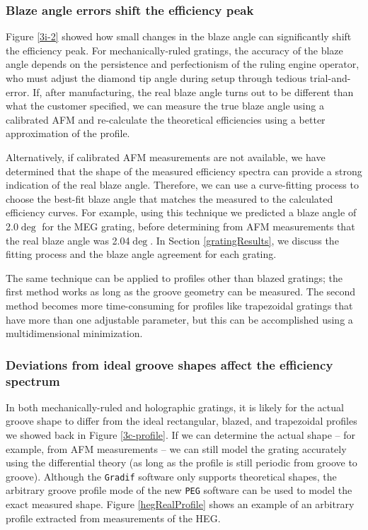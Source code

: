 \subsubsection{Blaze angle errors shift the efficiency peak}
Figure \ref{3i-2} showed how small changes in the blaze angle can significantly shift the efficiency peak.  For mechanically-ruled gratings, the accuracy of the blaze angle depends on the persistence and perfectionism of the ruling engine operator, who must adjust the diamond tip angle during setup through tedious trial-and-error.  If, after manufacturing, the real blaze angle turns out to be different than what the customer specified, we can measure the true blaze angle using a calibrated AFM and re-calculate the theoretical efficiencies using a better approximation of the profile.

Alternatively, if calibrated AFM measurements are not available, we have determined that the shape of the measured efficiency spectra 
can provide a strong indication of the real blaze angle.  Therefore, we can use a curve-fitting process to choose the best-fit blaze angle that matches the measured to the calculated efficiency curves.  For example, using this technique we predicted a blaze angle of 2.0$\deg$ for the MEG grating, before determining from AFM measurements that the real blaze angle was 2.04$\deg$.  In Section \ref{gratingResults}, we discuss the fitting process and the blaze angle agreement for each grating.

The same technique can be applied to profiles other than blazed gratings; the first method works as long as the groove geometry can be measured.  The second method becomes more time-consuming for profiles like trapezoidal gratings that have more than one adjustable parameter, but this can be accomplished using a multidimensional minimization.

\subsubsection{Deviations from ideal groove shapes affect the efficiency spectrum}
In both mechanically-ruled and holographic gratings, it is likely for the actual groove shape to differ from the ideal rectangular, blazed, and trapezoidal profiles we showed back in Figure \ref{3c-profile}.  If we can determine the actual shape -- for example, from AFM measurements -- we can still model the grating accurately using the differential theory (as long as the profile is still periodic from groove to groove).  Although the \texttt{Gradif} software only supports theoretical shapes, the arbitrary groove profile mode of the new \texttt{PEG} software can be used to model the exact measured shape.  Figure \ref{hegRealProfile} shows an example of an arbitrary profile extracted from measurements of the HEG.

